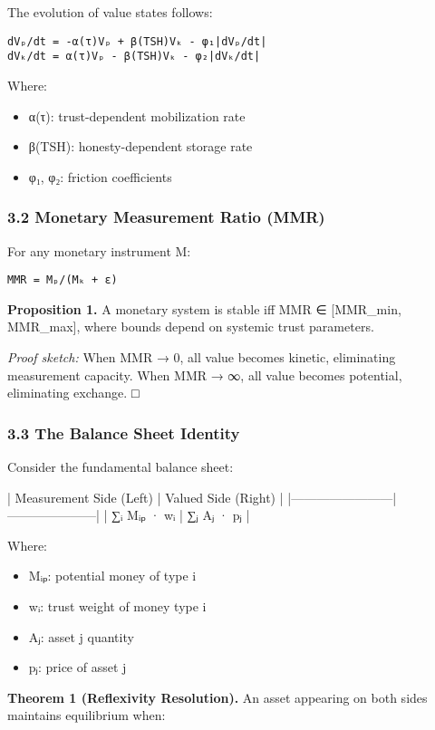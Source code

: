 \documentclass[11pt,oneside]{book}
\begin{document}
The evolution of value states follows:

\begin{verbatim}
dVₚ/dt = -α(τ)Vₚ + β(TSH)Vₖ - φ₁|dVₚ/dt|
dVₖ/dt = α(τ)Vₚ - β(TSH)Vₖ - φ₂|dVₖ/dt|
\end{verbatim}

Where:
\begin{itemize}
\item α(τ): trust-dependent mobilization rate
\item β(TSH): honesty-dependent storage rate
\item φ₁, φ₂: friction coefficients
\end{itemize}

\subsubsection{3.2 Monetary Measurement Ratio (MMR)}

For any monetary instrument M:

\begin{verbatim}
MMR = Mₚ/(Mₖ + ε)
\end{verbatim}

\textbf{Proposition 1.} A monetary system is stable iff MMR ∈ [MMR_min, MMR_max], where bounds depend on systemic trust parameters.

\textit{Proof sketch:} When MMR → 0, all value becomes kinetic, eliminating measurement capacity. When MMR → ∞, all value becomes potential, eliminating exchange. □

\subsubsection{3.3 The Balance Sheet Identity}

Consider the fundamental balance sheet:

| Measurement Side (Left) | Valued Side (Right) |
|------------------------|---------------------|
| ∑ᵢ Mᵢₚ · wᵢ | ∑ⱼ Aⱼ · pⱼ |

Where:
\begin{itemize}
\item Mᵢₚ: potential money of type i
\item wᵢ: trust weight of money type i
\item Aⱼ: asset j quantity
\item pⱼ: price of asset j
\end{itemize}

\textbf{Theorem 1 (Reflexivity Resolution).} An asset appearing on both sides maintains equilibrium when:
\end{document}
